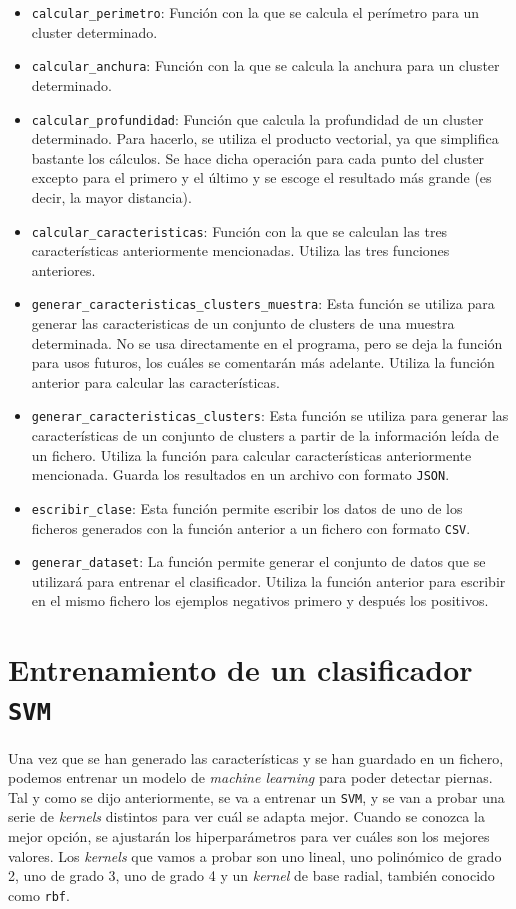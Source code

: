 \documentclass[11pt,a4paper]{article}
\begin{document}
\begin{itemize}[label=\textbullet]
	\item \texttt{calcular\_perimetro}: Función con la que se calcula el perímetro
	para un cluster determinado.
	\item \texttt{calcular\_anchura}: Función con la que se calcula la anchura para
	un cluster determinado.
	\item \texttt{calcular\_profundidad}: Función que calcula la profundidad de un
	cluster determinado. Para hacerlo, se utiliza el producto vectorial, ya que
	simplifica bastante los cálculos. Se hace dicha operación para cada punto
	del cluster excepto para el primero y el último y se escoge el resultado más
	grande (es decir, la mayor distancia).
	\item \texttt{calcular\_caracteristicas}: Función con la que se calculan las
	tres características anteriormente mencionadas. Utiliza las tres funciones anteriores.
	\item \texttt{generar\_caracteristicas\_clusters\_muestra}: Esta función se
	utiliza para generar las caracteristicas de un conjunto de clusters de una muestra
	determinada. No se usa directamente en el programa, pero se deja la función para usos
	futuros, los cuáles se comentarán más adelante. Utiliza la función anterior para
	calcular las características.
	\item \texttt{generar\_caracteristicas\_clusters}: Esta función se utiliza para
	generar las características de un conjunto de clusters a partir de la información
	leída de un fichero. Utiliza la función para calcular características anteriormente
	mencionada. Guarda los resultados en un archivo con formato \texttt{JSON}.
	\item \texttt{escribir\_clase}: Esta función permite escribir los datos de uno de
	los ficheros generados con la función anterior a un fichero con formato \texttt{CSV}.
	\item \texttt{generar\_dataset}: La función permite generar el conjunto de datos
	que se utilizará para entrenar el clasificador. Utiliza la función anterior para
	escribir en el mismo fichero los ejemplos negativos primero y después los positivos.
\end{itemize}

\section{Entrenamiento de un clasificador \texttt{SVM}}

Una vez que se han generado las características y se han guardado en un fichero, podemos
entrenar un modelo de \textit{machine learning} para poder detectar piernas. Tal
y como se dijo anteriormente, se va a entrenar un \texttt{SVM}, y se van a probar
una serie de \textit{kernels} distintos para ver cuál se adapta mejor. Cuando se conozca
la mejor opción, se ajustarán los hiperparámetros para ver cuáles son los mejores valores.
Los \textit{kernels} que vamos a probar son uno lineal, uno polinómico de grado 2, uno de
grado 3, uno de grado 4 y un \textit{kernel} de base radial, también conocido como \texttt{rbf}.
\end{document}
